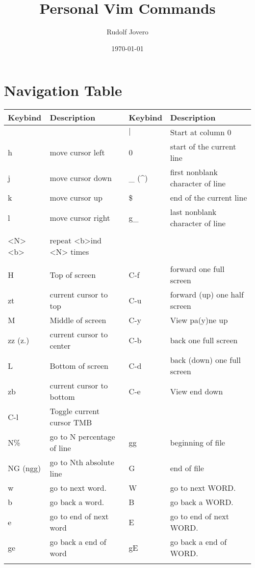 \documentclass[11pt]{article}
\author{Rudolf Jovero}
\date{\today}
\title{Personal Vim Commands}
\begin{document}
\maketitle
\tableofcontents

\section{Navigation Table}
\label{sec:org4f42fe6}
\begin{center}
\begin{tabular}{llll}
Keybind & Description & Keybind & Description\\
\hline
 &  & \(\vert{}\) & Start at column 0\\
h & move cursor left & 0 & start of the current line\\
j & move cursor down & \_ (\^{}) & first nonblank character of line\\
k & move cursor up & \$ & end of the current line\\
l & move cursor right & g\_ & last nonblank character of line\\
 &  &  & \\
<N><b> & repeat <b>ind <N> times &  & \\
 &  &  & \\
\hline
H & Top of screen & C-f & forward one full screen\\
zt & current cursor to top & C-u & forward (up) one half screen\\
M & Middle of screen & C-y & View pa(y)ne up\\
zz (z.) & current cursor to center & C-b & back one full screen\\
L & Bottom of screen & C-d & back (down) one full screen\\
zb & current cursor to bottom & C-e & View end down\\
C-l & Toggle current cursor TMB &  & \\
\hline
N\% & go to N percentage of line & gg & beginning of file\\
NG (ngg) & go to Nth absolute line & G & end of file\\
\hline
w & go to next word. & W & go to next WORD.\\
b & go back a word. & B & go back a WORD.\\
e & go to end of next word & E & go to end of next WORD.\\
ge & go back a end of word & gE & go back a end of WORD.\\
 &  &  & \\

\end{tabular}
\end{center}
\end{document}
